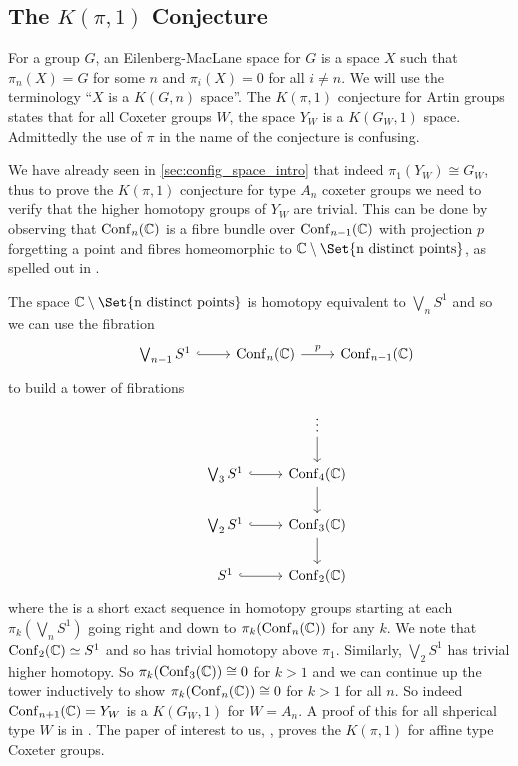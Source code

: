 \documentclass[class=article, crop=false]{standalone}
\begin{document}
	
\subsection{The $K(\pi,1)$ Conjecture}
For a group $G$, an Eilenberg-MacLane space \cite{eilenberg_relations_1945} for $G$ is a space $X$ such that $\pi_n(X)=G$ for some $n$ and $\pi_i(X) = 0$ for all $i\neq n$. We will use the terminology ``$X$ is a $K(G,n)$ space''. The $K(\pi,1)$ conjecture for Artin groups states that for all Coxeter groups $W$, the space $Y_W$ is a $K(G_W,1)$ space. Admittedly the use of $\pi$ in the name of the conjecture is confusing.

We have already seen in \cref{sec:config_space_intro} that indeed $\pi_1(Y_W) \cong G_W$, thus to prove the $K(\pi, 1)$ conjecture for type $A_n$ coxeter groups we need to verify that the higher homotopy groups of $Y_W$ are trivial. This can be done by observing that $\operatorname{Conf}_n(\mathbb{C})$ is a fibre bundle over $\operatorname{Conf}_{n-1}(\mathbb{C})$ with projection $p$ forgetting a point and fibres homeomorphic to $\C \setminus \Set{\text{n distinct points}}$, as spelled out in \cite{sinha_homology_2010}.

The space $\C \setminus \Set{\text{n distinct points}}$ is homotopy equivalent to $\bigvee_n S^1$ and so we can use the fibration
\begin{equation*}
	\begin{tikzcd}
		&\bigvee_{n-1} S^1 \arrow[hook]{r} &\conf_n(\C) \arrow{r}{p} &\conf_{n-1}(\C)
	\end{tikzcd}
\end{equation*}
to build a tower of fibrations
\begin{equation*}
	\begin{tikzcd}
		& 							&\vdots \arrow{d} 	\\
		&\bigvee_3 S^1 	\arrow[hook]{r} 	&\conf_4(\C)  \arrow{d} \\
		&\bigvee_2 S^1 	\arrow[hook]{r} 	&\conf_3(\C)  \arrow{d} \\
		&S^1 	\arrow[hook]{r} 	&\conf_2(\C)
	\end{tikzcd}
\end{equation*}
where the is a short exact sequence in homotopy groups starting at each $\pi_k(\bigvee_n S^1)$ going right and down to $\pi_k(\operatorname{Conf}_n(\mathbb{C}))$ for any $k$. We note that $\operatorname{Conf}_2(\mathbb{C}) \simeq S^1$ and so has trivial homotopy above $\pi_1$. Similarly, $\bigvee_2 S^1$ has trivial higher homotopy. So $\pi_k(\operatorname{Conf}_3(\mathbb{C})) \cong 0$ for $k>1$ and we can continue up the tower inductively to show $\pi_k(\operatorname{Conf}_n(\mathbb{C})) \cong 0$ for $k>1$ for all $n$. So indeed $\operatorname{Conf}_{n+1}(\mathbb{C}) = Y_W$ is a $K(G_W,1)$ for $W=A_n$. A proof of this for all shperical type $W$ is in \cite{deligne_les_1972}. The paper of interest to us, \cite{paolini_salvetti_kpi1_2021}, proves the $K(\pi,1)$ for affine type Coxeter groups. 
\end{document}

